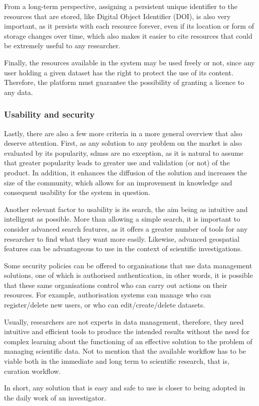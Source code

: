From a long-term perspective, assigning a persistent unique identifier to the resources that are stored, like Digital Object Identifier (DOI), is also very important, as it persists with each resource forever, even if its location or form of storage changes over time, which also makes it easier to cite resources that could be extremely useful to any researcher.
    
Finally, the resources available in the system may be used freely or not, since any user holding a given dataset has the right to protect the use of its content. Therefore, the platform must guarantee the possibility of granting a licence to any data.
    
\subsubsection{Usability and security}
    
Lastly, there are also a few more criteria in a more general overview that also deserve attention. First, as any solution to any problem on the market is also evaluated by its popularity, \gls{sdms}s are no exception, as it is natural to assume that greater popularity leads to greater use and validation (or not) of the product. In addition, it enhances the diffusion of the solution and increases the size of the community, which allows for an improvement in knowledge and consequent usability for the system in question.

Another relevant factor to usability is its search, the aim being as intuitive and intelligent as possible. More than allowing a simple search, it is important to consider advanced search features, as it offers a greater number of tools for any researcher to find what they want more easily. Likewise, advanced geospatial features can be advantageous to use in the context of scientific investigations.
    
Some security policies can be offered to organisations that use data management solutions, one of which is authorised authentication, in other words, it is possible that these same organisations control who can carry out actions on their resources. For example, authorisation systems can manage who can register/delete new users, or who can edit/create/delete datasets.
    
Usually, researchers are not experts in data management, therefore, they need intuitive and efficient tools to produce the intended results without the need for complex learning about the functioning of an effective solution to the problem of managing scientific data. Not to mention that the available workflow has to be viable both in the immediate and long term to scientific research, that is, curation workflow.  
    
In short, any solution that is easy and safe to use is closer to being adopted in the daily work of an investigator.
